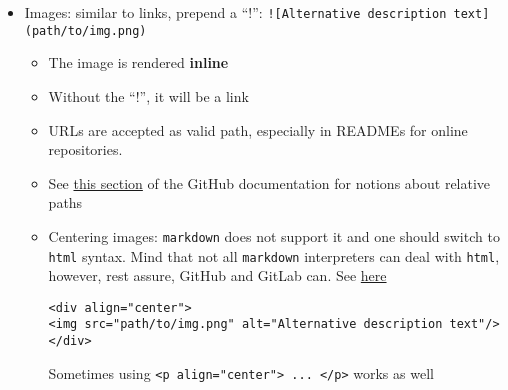 \documentclass[a4paper,12pt,%
              final%
              ]{article}
\begin{document}
\begin{itemize}
\begin{itemize}
\begin{verbatim}
[id]: https://url.com "The title"
\end{verbatim}
      \item \href{https://github.blog/changelog/2021-09-30-footnotes-now-supported-in-markdown-fields/}{Footnotes}:
\begin{verbatim}
A simple footnote[^1]. Some text after.

[^1]: The long footnote
\end{verbatim}
      \item Bibliography: with standard syntax (plus a bit of \texttt{html}), see \href{https://stackoverflow.com/questions/26587527/cite-a-paper-using-github-markdown-syntax}{here}
\begin{verbatim}
"...the **go to** statement should be abolished..." [[1]](#1).

## References
<a id="1">[1]</a>
Dijkstra, E. W. (1968).
Go to statement considered harmful.
Communications of the ACM, 11(3), 147-148.
\end{verbatim}
    \end{itemize}
  \item Images: similar to links, prepend a ``!'': \verb|![Alternative description text](path/to/img.png)|
    \begin{itemize}
      \item The image is rendered \textbf{inline}
      \item Without the ``!'', it will be a link
      \item URLs are accepted as valid path, especially in READMEs for online repositories.
      \item See \href{https://docs.github.com/en/get-started/writing-on-github/getting-started-with-writing-and-formatting-on-github/basic-writing-and-formatting-syntax#images}{this section} of the GitHub documentation for notions about relative paths
      \item Centering images: \texttt{markdown} does not support it and one should switch to \texttt{html} syntax. Mind that not all \texttt{markdown} interpreters can deal with \texttt{html}, however, rest assure, GitHub and GitLab can. See \href{https://stackoverflow.com/questions/12090472/how-do-i-center-an-image-in-the-readme-md-file-on-github}{here}
\begin{verbatim}
<div align="center">
<img src="path/to/img.png" alt="Alternative description text"/>
</div>
\end{verbatim}
        Sometimes using \verb|<p align="center"> ... </p>| works as well
    \end{itemize}

\end{itemize}
\end{document}
